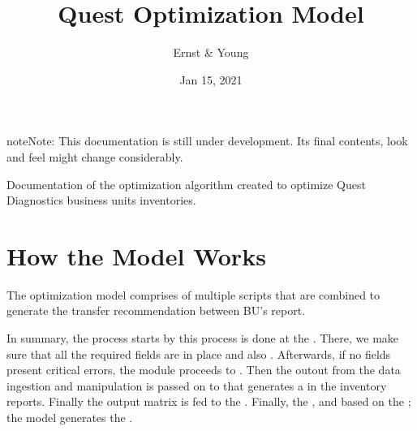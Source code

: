 \documentclass[letterpaper,10pt,english]{sphinxmanual}
\title{Quest Optimization Model}
\date{Jan 15, 2021}
\author{Ernst \& Young}
\begin{document}
\pagestyle{empty}
\sphinxmaketitle
\pagestyle{plain}
\sphinxtableofcontents
\pagestyle{normal}
\label{\detokenize{index::doc}}
\begin{sphinxadmonition}{note}{Note:}
This documentation is still under development. Its final contents, look and feel might change considerably.
\end{sphinxadmonition}




Documentation of the optimization algorithm created to optimize Quest Diagnostics business units inventories.


\chapter{How the Model Works}
\label{\detokenize{index:how-the-model-works}}
The optimization model comprises of multiple scripts that are combined to generate the transfer recommendation between BU’s report.

In summary, the process starts by  this process is done at the {\hyperref[\detokenize{source/optimization.datatools:module-optimization.datatools.pipelines}]{}}.
There, we make sure that all the required fields are in place and also . Afterwards, if no fields present critical errors, the module proceeds to
. Then the outout from the data ingestion and manipulation is passed on to
{\hyperref[\detokenize{source/optimization:module-optimization.solspace}]{}} that generates a  in the inventory reports. Finally the output matrix is fed
to the {\hyperref[\detokenize{source/optimization.model:module-optimization.model.optimizer}]{}}. Finally, the , and based on the ; the model generates
the .
\end{document}
